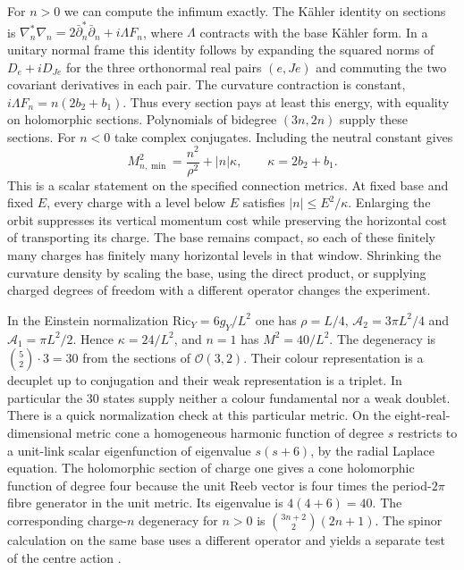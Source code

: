 \documentclass[10pt]{article}
\begin{document}
For $n>0$ we can compute the infimum exactly. The K\"ahler identity on sections is $\nabla_n^*\nabla_n=2\bar\partial_n^*\bar\partial_n+i\Lambda F_n$, where $\Lambda$ contracts with the base K\"ahler form. In a unitary normal frame this identity follows by expanding the squared norms of $D_e+iD_{Je}$ for the three orthonormal real pairs $(e,Je)$ and commuting the two covariant derivatives in each pair. The curvature contraction is constant, $i\Lambda F_n=n(2b_2+b_1)$. Thus every section pays at least this energy, with equality on holomorphic sections. Polynomials of bidegree $(3n,2n)$ supply these sections. For $n<0$ take complex conjugates. Including the neutral constant gives
\begin{equation}
 \boxed{\ M_{n,\min}^2=\frac{n^2}{\rho^2}+|n|\kappa,\qquad
              \kappa=2b_2+b_1.\ }
 \label{eq:curvedgap}
\end{equation}
This is a scalar statement on the specified connection metrics. At fixed base and fixed $E$, every charge with a level below $E$ satisfies $|n|\le E^2/\kappa$. Enlarging the orbit suppresses its vertical momentum cost while preserving the horizontal cost of transporting its charge. The base remains compact, so each of these finitely many charges has finitely many horizontal levels in that window. Shrinking the curvature density by scaling the base, using the direct product, or supplying charged degrees of freedom with a different operator changes the experiment.

In the Einstein normalization $\mathrm{Ric}_Y=6g_Y/L^2$ one has $\rho=L/4$, $\mathcal A_2=3\pi L^2/4$ and $\mathcal A_1=\pi L^2/2$. Hence $\kappa=24/L^2$, and $n=1$ has $M^2=40/L^2$. The degeneracy is $\binom{5}{2}\cdot3=30$ from the sections of $\mathcal O(3,2)$. Their colour representation is a decuplet up to conjugation and their weak representation is a triplet. In particular the 30 states supply neither a colour fundamental nor a weak doublet. There is a quick normalization check at this particular metric. On the eight-real-dimensional metric cone a homogeneous harmonic function of degree $s$ restricts to a unit-link scalar eigenfunction of eigenvalue $s(s+6)$, by the radial Laplace equation. The holomorphic section of charge one gives a cone holomorphic function of degree four because the unit Reeb vector is four times the period-$2\pi$ fibre generator in the unit metric. Its eigenvalue is $4(4+6)=40$. The corresponding charge-$n$ degeneracy for $n>0$ is $\binom{3n+2}{2}(2n+1)$. The spinor calculation on the same base uses a different operator and yields a separate test of the centre action \cite{Fabbri1999,SevenMTheory2026}.
\end{document}
